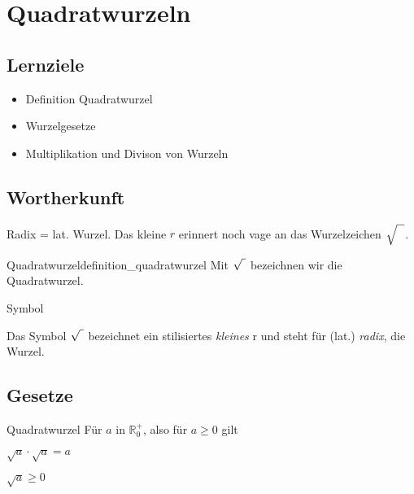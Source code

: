 
\section{Quadratwurzeln}\index{$\sqrt{\mathstrut{}\,}$}



\subsection*{Lernziele}

\begin{itemize}
\item Definition Quadratwurzel
\item Wurzelgesetze
\item Multiplikation und Divison von Wurzeln
\end{itemize}

\noTRAINER{\vspace{35mm}}

\subsection{Wortherkunft}
Radix = lat. Wurzel.
Das kleine $r$ erinnert noch vage an das Wurzelzeichen $\sqrt{\strut{}\ \ }$.

\begin{definition}{Quadratwurzel}{definition_quadratwurzel}
Mit $\sqrt{\vphantom{b} \,\,}$ bezeichnen wir die
Quadratwurzel.
\end{definition}

\begin{bemerkung}{Symbol}{}
  
Das Symbol $\sqrt{\vphantom{b} \,\,}$
bezeichnet ein stilisiertes {\textit{kleines}} {\huge{r}} und steht für
  (lat.) \textit{radix}, die Wurzel.
\end{bemerkung}
\newpage

\subsection{Gesetze}

\begin{definition}{Quadratwurzel}{}
Für $a$ in $\mathbb{R}_0^{+}$, also für $a\ge 0$ gilt

$\sqrt{a} \cdot \sqrt{a} = a$

$\sqrt{a} \ge 0$
\end{definition}



